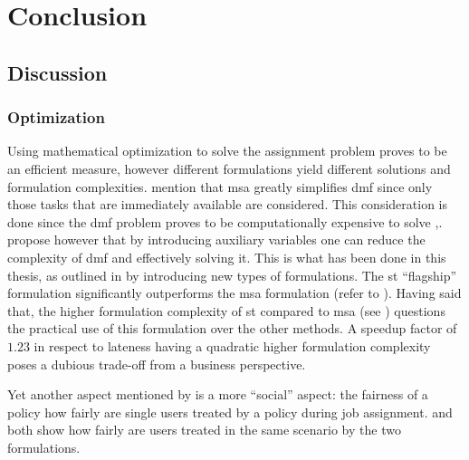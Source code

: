 \chapter{Conclusion}
\label{ch:conclusion}

\section{Discussion}

\subsection{Optimization}
\label{subsec:optimization_discussion}

Using mathematical optimization to solve the assignment problem proves to be an efficient measure, however different formulations yield different solutions and formulation complexities. \citet[p. 15]{Zeng2005} mention that \gls{msa} greatly simplifies \gls{dmf} since only those tasks that are immediately available are considered. This consideration is done since the \gls{dmf} problem proves to be computationally expensive to solve \citep[p. 13]{Zeng2005},\citep{Garey1990}. \citet[p. 13]{Zeng2005} propose however that by introducing auxiliary variables one can reduce the complexity of \gls{dmf} and effectively solving it. This is what has been done in this thesis, as outlined in  by introducing new types of formulations. The \gls{st} ``flagship'' formulation significantly outperforms the \gls{msa} formulation (refer to ). Having said that, the higher formulation complexity of \gls{st} compared to \gls{msa} (see ) questions the practical use of this formulation over the other methods. A speedup factor of $1.23$ in respect to lateness having a quadratic higher formulation complexity poses a dubious trade-off from a business perspective.


Yet another aspect mentioned by \citet[pp. 17--18]{Zeng2005} is a more ``social'' aspect: the fairness of a policy \ie how fairly are single users treated by a policy during job assignment.  and  both show how fairly are users treated in the same scenario by the two formulations.

